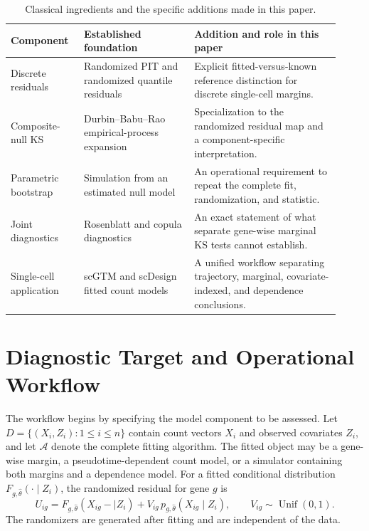 \documentclass[preprint,12pt]{elsarticle}
\theoremstyle{plain}
\theoremstyle{remark}
\begin{document}
\begin{table}[!htbp]
\centering
\scriptsize
\caption{Classical ingredients and the specific additions made in this paper.}
\label{tab:novelty-map}
\setlength{\tabcolsep}{4pt}
\begin{tabular}{@{}>{\raggedright\arraybackslash}p{0.20\linewidth}>{\raggedright\arraybackslash}p{0.31\linewidth}>{\raggedright\arraybackslash}p{0.41\linewidth}@{}}
\toprule
Component & Established foundation & Addition and role in this paper\\
\midrule
Discrete residuals & Randomized PIT and randomized quantile residuals &
Explicit fitted-versus-known reference distinction for discrete single-cell margins.\\
\addlinespace
Composite-null KS & Durbin--Babu--Rao empirical-process expansion &
Specialization to the randomized residual map and a component-specific interpretation.\\
\addlinespace
Parametric bootstrap & Simulation from an estimated null model &
An operational requirement to repeat the complete fit, randomization, and statistic.\\
\addlinespace
Joint diagnostics & Rosenblatt and copula diagnostics &
An exact statement of what separate gene-wise marginal KS tests cannot establish.\\
\addlinespace
Single-cell application & scGTM and scDesign fitted count models &
A unified workflow separating trajectory, marginal, covariate-indexed, and dependence conclusions.\\
\bottomrule
\end{tabular}
\end{table}

\section{Diagnostic Target and Operational Workflow}
\label{sec:workflow}

The workflow begins by specifying the model component to be assessed.
Let $D=\{(X_i,Z_i):1\le i\le n\}$ contain count vectors $X_i$ and
observed covariates $Z_i$, and let $\mathcal A$ denote the complete fitting
algorithm. The fitted object may be a gene-wise margin, a pseudotime-dependent
count model, or a simulator containing both margins and a dependence model.
For a fitted conditional distribution $F_{g,\widehat\theta}(\cdot\mid Z_i)$,
the randomized residual for gene $g$ is
\[
U_{ig}=F_{g,\widehat\theta}(X_{ig}-\mid Z_i)
      +V_{ig}\,p_{g,\widehat\theta}(X_{ig}\mid Z_i),
\qquad V_{ig}\sim\operatorname{Unif}(0,1).
\]
The randomizers are generated after fitting and are independent of the data.
\end{document}
